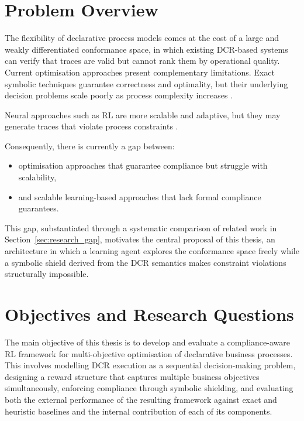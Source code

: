 \section{Problem Overview}
\label{sec:problem_overview}

The flexibility of declarative process models comes at the cost of a
large and weakly differentiated conformance space, in which existing
\ac{DCR}-based systems can verify that traces are valid but cannot rank
them by operational quality.
Current optimisation approaches present complementary limitations.
Exact symbolic techniques guarantee correctness and optimality, but
their underlying decision problems scale poorly as process complexity increases \cite{Diaz2024Pareto-OptimalModels, Felli2023Data-awareSMT}.

Neural approaches such as \ac{RL} are more scalable and adaptive, but
they may generate traces that violate process constraints
\cite{Garcia2015ALearning}.

Consequently, there is currently a gap between:
\begin{itemize}
    \item optimisation approaches that guarantee compliance but struggle
    with scalability,
    \item and scalable learning-based approaches that lack formal
    compliance guarantees.
\end{itemize}

This gap, substantiated through a systematic comparison of related work
in Section~\ref{sec:research_gap},
motivates the central proposal of this thesis, an architecture in which
a learning agent explores the conformance space freely while a symbolic
shield derived from the \ac{DCR} semantics makes constraint violations
structurally impossible.

\section{Objectives and Research Questions}
\label{sec:research_questions}

The main objective of this thesis is to develop and evaluate a
compliance-aware \ac{RL} framework for multi-objective optimisation of
declarative business processes.
This involves modelling \ac{DCR} execution as a sequential
decision-making problem, designing a reward structure that captures
multiple business objectives simultaneously, enforcing compliance
through symbolic shielding, and evaluating both the external performance
of the resulting framework against exact and heuristic baselines and the
internal contribution of each of its components.

